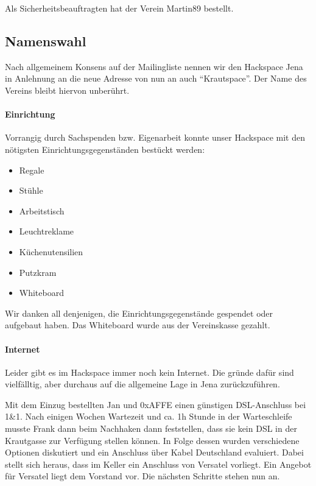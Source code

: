 \documentclass[10pt,DIV16]{scrartcl}
\begin{document}
Als Sicherheitsbeauftragten hat der Verein Martin89 bestellt.

\subsection{Namenswahl}

Nach allgemeinem Konsens auf der Mailingliste nennen wir den Hackspace Jena in
Anlehnung an die neue Adresse von nun an auch "`Krautspace"'.  Der Name des
Vereins bleibt hiervon unberührt.

\paragraph{Einrichtung}

Vorrangig durch Sachspenden bzw. Eigenarbeit konnte unser Hackspace mit den
nötigsten Einrichtungsgegenständen bestückt werden:
\begin{itemize}
	\item Regale
	\item Stühle
	\item Arbeitstisch
	\item Leuchtreklame
	\item Küchenutensilien
	\item Putzkram
	\item Whiteboard
\end{itemize}
Wir danken all denjenigen, die Einrichtungsgegenstände gespendet oder
aufgebaut haben.  Das Whiteboard wurde aus der Vereinskasse gezahlt.

\paragraph{Internet}

Leider gibt es im Hackspace immer noch kein Internet. Die gründe 
dafür sind vielfälltig, aber durchaus auf die allgemeine Lage in 
Jena zurückzuführen. 

Mit dem Einzug bestellten Jan und 0xAFFE einen günstigen 
DSL-Anschluss bei 1\&1. Nach einigen Wochen Wartezeit und ca. 1h 
Stunde in der Warteschleife musste Frank dann beim Nachhaken dann 
feststellen, dass sie kein DSL in der Krautgasse zur Verfügung 
stellen können. In Folge dessen wurden verschiedene Optionen 
diskutiert und ein Anschluss über Kabel Deutschland evaluiert. Dabei 
stellt sich heraus, dass im Keller ein Anschluss von Versatel 
vorliegt. Ein Angebot für Versatel liegt dem Vorstand vor. Die 
nächsten Schritte stehen nun an.
\end{document}
